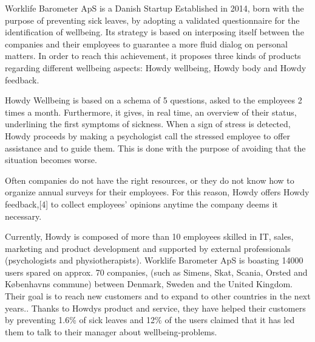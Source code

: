 


Worklife Barometer ApS is a Danish Startup Established in 2014, born with the purpose of preventing sick leaves, by adopting a validated questionnaire for the identification of wellbeing. Its strategy is based on interposing itself between the companies and their employees to guarantee a more fluid dialog on personal matters.     
In order to reach this achievement, it proposes three kinds of products regarding different wellbeing aspects: Howdy wellbeing, Howdy body and Howdy feedback.\cite{howdywebsite}

\noindent Howdy Wellbeing is based on a schema of 5 questions, asked to the employees 2 times a month.
Furthermore, it gives, in real time, an overview of their status, underlining the first symptoms of sickness.
When a sign of stress is detected, Howdy proceeds by making a psychologist call the stressed employee to offer assistance and to guide them. This is done with the purpose of avoiding that the situation becomes worse.

\noindent Often companies do not have the right resources, or they do not know how to organize annual surveys for their employees. For this reason, Howdy offers Howdy feedback,[4] to collect employees’ opinions anytime the company deems it necessary.

\noindent Currently, Howdy is composed of more than 10 employees skilled in IT, sales, marketing and product development and supported by external professionals (psychologists and physiotherapists). Worklife Barometer ApS is boasting 14000 users spared on approx. 70 companies, (such as Simens, Skat, Scania, Orsted and Københavns commune) between Denmark, Sweden and the United Kingdom. Their goal is to reach new customers and to expand to other countries in the next years.\cite{howdywebsite}. Thanks to Howdys product and service, they have helped their customers by preventing 1.6\% of sick leaves and 12\% of the users claimed that it has led them to talk to their manager about wellbeing-problems. \cite{howdywebsite}  

